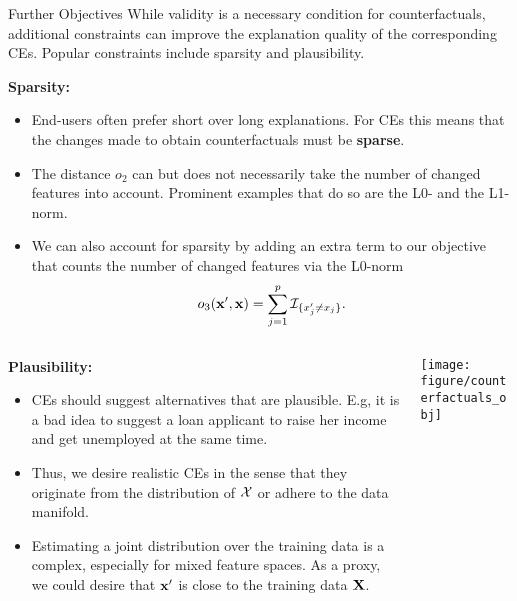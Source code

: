 \documentclass[11pt,compress,t,notes=noshow, aspectratio=169, xcolor=table]{beamer}
\begin{document}
\begin{vbframe}[allowframebreaks]{Further Objectives}
	While validity is a necessary condition for counterfactuals, additional constraints can improve the explanation quality of the corresponding CEs. Popular constraints include sparsity and plausibility.
	
	\textbf{Sparsity:}
	\begin{itemize}
		\item End-users often prefer short over long explanations. For CEs this means that the changes made to obtain counterfactuals must be \textbf{sparse}. 
		\item The distance $o_2$ can but does not necessarily take the number of changed features into account. Prominent examples that do so are the L0- and the L1-norm.
        \item We can also account for sparsity by adding an extra term to our objective that counts the number of changed features via the L0-norm $$o_3(\mathbf{x}', \mathbf{x}) = \sum_{j = 1}^p {\mathcal{I}}_{\{ x'_j \neq x_j \}}.$$ 
	\end{itemize}
	\framebreak
	
	\begin{columns}
	\begin{column}{0.55\textwidth}
		\textbf{Plausibility:}
		\begin{itemize}
			\item CEs should suggest alternatives that are plausible. E.g, it is a bad idea to suggest a loan applicant to raise her income and get unemployed at the same time. 
			\item Thus, we desire realistic CEs in the sense that they originate from the distribution of $\mathcal{X}$ or adhere to the data manifold. 
			\item Estimating a joint distribution over the training data is a complex, especially for mixed feature spaces. As a proxy, we could desire that $\mathbf{x}'$ is close to the training data $\mathbf{X}$. 
		\end{itemize}	
	\end{column}
	\begin{column}{0.4\textwidth}
			\begin{center}
			\texttt{[image: figure/counterfactuals\_obj]}
		\end{center}
		

\end{column}
\end{columns}
\end{vbframe}
\end{document}
